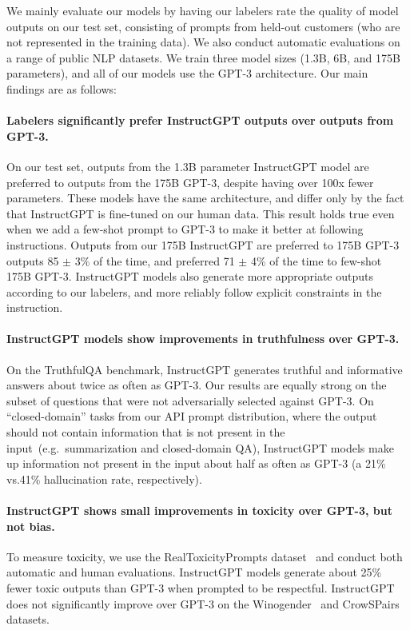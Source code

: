 We mainly evaluate our models by having our labelers rate the quality of model outputs on our test set, consisting of prompts from held-out customers (who are not represented in the training data). We also conduct automatic evaluations on a range of public NLP datasets. We train three model sizes (1.3B, 6B, and 175B parameters), and all of our models use the GPT-3 architecture. Our main findings are as follows:

\paragraph{Labelers significantly prefer InstructGPT outputs over outputs from GPT-3.} On our test set, outputs from the 1.3B parameter InstructGPT model are preferred to outputs from the 175B GPT-3, despite having over 100x fewer parameters. These models have the same architecture, and differ only by the fact that InstructGPT is fine-tuned on our human data. This result holds true even when we add a few-shot prompt to GPT-3 to make it better at following instructions. Outputs from our 175B InstructGPT are preferred to 175B GPT-3 outputs 85 $\pm$ 3\% of the time, and preferred 71 $\pm$ 4\% of the time to few-shot 175B GPT-3. InstructGPT models also generate more appropriate outputs according to our labelers, and more reliably follow explicit constraints in the instruction.

\paragraph{InstructGPT models show improvements in truthfulness over GPT-3.} On the TruthfulQA benchmark, InstructGPT generates truthful and informative answers about twice as often as GPT-3. Our results are equally strong on the subset of questions that were not adversarially selected against GPT-3. On ``closed-domain'' tasks from our API prompt distribution, where the output should not contain information that is not present in the input~(e.g.\ summarization and closed-domain QA), InstructGPT models make up information not present in the input about half as often as GPT-3 (a 21\% vs.\@ 41\% hallucination rate, respectively).

\paragraph{InstructGPT shows small improvements in toxicity over GPT-3, but not bias.} To measure toxicity, we use the RealToxicityPrompts dataset~\citep{gehman2020realtoxicityprompts} and conduct both automatic and human evaluations. InstructGPT models generate about 25\% fewer toxic outputs than GPT-3 when prompted to be respectful. InstructGPT does not significantly improve over GPT-3 on the Winogender~\citep{rudinger2018gender} and CrowSPairs~\citep{nangia2020crows} datasets.    

